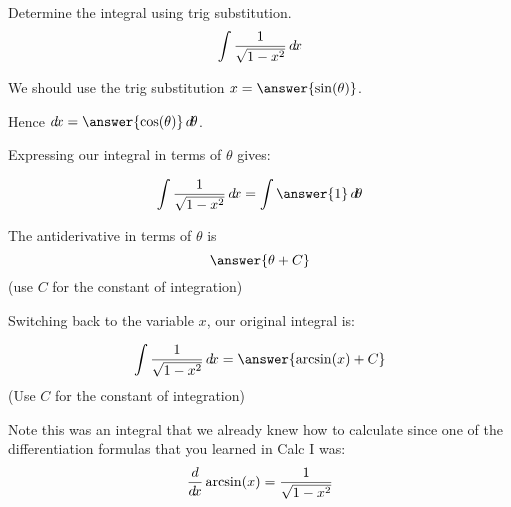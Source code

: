 \documentclass{ximera}
\author{Jason Miller}
\begin{document}
\begin{exercise}
Determine the integral using trig substitution. 
\[
\int \frac{1}{\sqrt{1-x^{2}}} \mathop{}\!d\! x
\]

We should use the trig substitution $x=\answer{ \sin(\theta)}$. 

Hence $\d x=\answer{ \cos(\theta) } \d \theta$.

Expressing our integral in terms of $\theta$ gives:

\begin{exercise}

\[
\int \frac{1}{\sqrt{1-x^{2}}} \d x=\int \answer{ 1  }   \d \theta 
\]


\begin{exercise}
The antiderivative in terms of $\theta$ is 
\[
\answer{ \theta + C}
\]
(use $C$ for the constant of integration)

\begin{exercise}
Switching back to the variable $x$, our original integral is:

\[
\int \frac{1}{\sqrt{1-x^{2}}} \d x= \answer{ \arcsin(x) + C }
\]
(Use $C$ for the constant of integration)

\begin{exercise}
Note this was an integral that we already knew how to calculate since one of the 
differentiation formulas that you learned in Calc I was:
\[
\frac{d}{\mathop{}\!d\! x} \arcsin(x)=\frac{1}{\sqrt{1-x^{2}}}
\]

\end{exercise}
\end{exercise}
\end{exercise}
\end{exercise}
\end{exercise}
\end{document}
